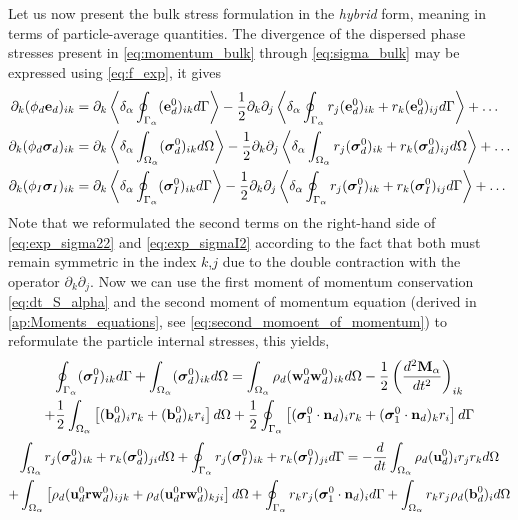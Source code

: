 Let us now present the bulk stress formulation in the \textit{hybrid} form, meaning in terms of particle-average quantities.  
The divergence of the dispersed phase stresses present in \ref{eq:momentum_bulk} through \ref{eq:sigma_bulk} may be expressed using \ref{eq:f_exp}, it gives
\begin{align}
    \label{eq:exp_e2}
    \partial_k (\phi_d \textbf{e}_d)_{ik} 
    &=  \partial_k\left<\delta_\alpha \oint_{\Gamma_\alpha}  (\textbf e_d^0)_{ik}  d\Gamma\right>
        -\frac{1}{2} \partial_k\partial_j \left<\delta_\alpha \oint_{\Gamma_\alpha}  r_j (\textbf e_d^0)_{ik} +r_k (\textbf e_d^0)_{ij}  d\Gamma\right>
        + \ldots  \\
    \label{eq:exp_sigma22}
    \partial_k (\phi_d \bm\sigma_d)_{ik}
    &=  \partial_k\left<\delta_\alpha \int_{\Omega_\alpha}  (\bm\sigma_d^0)_{ik} d\Omega\right>
    -\frac{1}{2} \partial_k\partial_j
    \left<\delta_\alpha \int_{\Omega_\alpha}  r_j(\bm\sigma^0_d)_{ik} + r_k(\bm\sigma^0_d)_{ij} d\Omega\right>
    + \ldots  \\
    \label{eq:exp_sigmaI2}
    \partial_k (\phi_I \bm\sigma_I)_{ik} 
    &=  \partial_k\left<\delta_\alpha \oint_{\Gamma_\alpha}  (\bm\sigma_I^0)_{ik}  d\Gamma\right>
        -\frac{1}{2} \partial_k\partial_j \left<\delta_\alpha \oint_{\Gamma_\alpha}  r_j (\bm\sigma_I^0)_{ik} +r_k (\bm\sigma_I^0)_{ij}  d\Gamma\right>
        + \ldots  
\end{align}
Note that we reformulated the second terms on the right-hand side of \ref{eq:exp_sigma22} and \ref{eq:exp_sigmaI2} according to the fact that both must remain symmetric in the index $k$,$j$ due to the double contraction with the operator $\partial_k\partial_j$. 
Now we can use the first moment of momentum conservation \eqref{eq:dt_S_alpha} and the second moment of momentum equation (derived in \ref{ap:Moments_equations}, see \eqref{eq:second_momoent_of_momentum}) to reformulate the particle internal stresses, this yields,  
\begin{multline}
    \oint_{\Gamma_\alpha}  (\bm{\sigma}_I^0)_{ik} d\Gamma
    +\int_{\Omega_\alpha}  (\bm{\sigma}_d^0)_{ik} d\Omega
    = 
    \int_{\Omega_\alpha}  \rho_d 
    (\textbf{w}_d^0\textbf{w}_d^0  )_{ik}
     d\Omega
    -\frac{1}{2}\left(\frac{d^2 \textbf{M}_\alpha}{dt^2} \right)_{ik}\\
    +\frac{1}{2}\int_{\Omega_\alpha}  \left[
        (\textbf{b}_d^0)_i
        r_k 
        + (\textbf{b}_d^0)_k
        r_i
    \right] d\Omega
    +
    \frac{1}{2}\oint_{\Gamma_\alpha}  \left[
        (\bm{\sigma}_1^0 \cdot \textbf{n}_d)_i r_k
        + (\bm{\sigma}_1^0 \cdot \textbf{n}_d)_k r_i
    \right]
     d\Gamma
    \label{eq:dt_P1_alpha_bis}
\end{multline}
\begin{multline}
    \int_{\Omega_\alpha}  r_{j}(\bm{\sigma}^0_d)_{ik}+r_{k}(\bm{\sigma}^0_d)_{ji} d\Omega
    +\oint_{\Gamma_\alpha}  r_{j}(\bm{\sigma}^0_I)_{ik}+r_{k}(\bm{\sigma}_I^0)_{ji} d\Gamma
    = 
    - \frac{d}{dt}\int_{\Omega_\alpha}  \rho_d (\textbf{u}_d^0)_i r_j r_k  d\Omega
    \\
    + \int_{\Omega_\alpha}  \left[
        \rho_d (\textbf{u}^0_d\textbf{r}\textbf{w}_d^0)_{ijk} + \rho_d (\textbf{u}^0_d\textbf{r}\textbf{w}_d^0)_{kji}
    \right] d\Omega
    +\oint_{\Gamma_\alpha}   r_{k}r_{j} (\bm{\sigma}_1^0\cdot\textbf{n}_d)_i  d\Gamma
    + \int_{\Omega_\alpha}  r_{k}r_{j}  \rho_d (\textbf{b}_d^0)_i  d\Omega 
    \label{eq:dt_P2_alpha_bis}
\end{multline}
